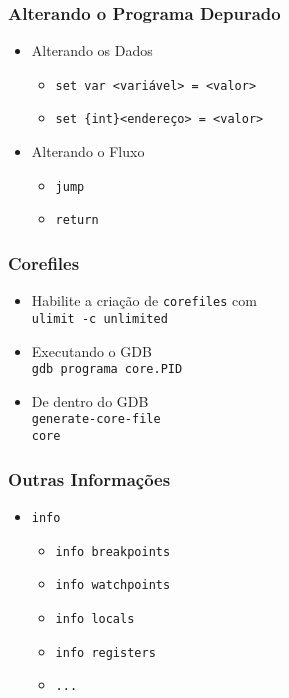\documentclass[xcolor=pdftex,dvipsnames,table,t]{beamer}
\begin{document}
\begin{frame}[fragile]
	\frametitle{Alterando o Programa Depurado}
	  \begin{itemize}
	    \item{Alterando os Dados}
	      \begin{itemize}
		\item{\verb|set var <variável> = <valor>|}
		\item{\verb|set {int}<endereço> = <valor>|}
	      \end{itemize}
	    \item{Alterando o Fluxo}
	      \begin{itemize}
		\item{\verb|jump|}
		\item{\verb|return|}
	      \end{itemize}
	  \end{itemize}
\end{frame}

\begin{frame}[fragile]
	\frametitle{Corefiles} %
	  \begin{itemize}
	  \item{Habilite a criação de \verb|corefiles| com \\
		\verb|ulimit -c unlimited|}
	  \item{Executando o GDB \\
		\verb|gdb programa core.PID|}
	  \item{De dentro do GDB \\
		\verb|generate-core-file| \\
		\verb|core|}
	  \end{itemize}
\end{frame}

\begin{frame}[fragile]
	\frametitle{Outras Informações}
	  \begin{itemize}
	    \item{\verb|info|}
	    \begin{itemize}
	      \item{\verb|info breakpoints|}
	      \item{\verb|info watchpoints|}
	      \item{\verb|info locals|}
	      \item{\verb|info registers|}
	      \item{\verb|...|}
	    \end{itemize}
	  \end{itemize}
\end{frame}
\end{document}
